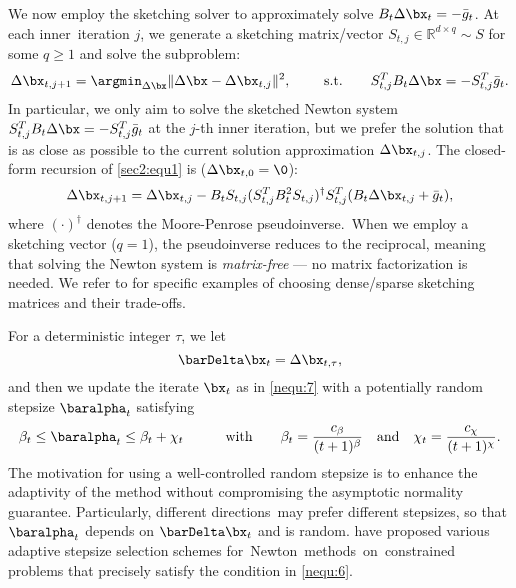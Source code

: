 We now employ the sketching solver to approximately solve $B_t\Delta\bx_t = -\bar{g}_t$. At each inner~iteration $j$, we generate a sketching matrix/vector $S_{t,j}\in\mathbb{R}^{d\times q}\sim S$ for some $q\geq 1$ and solve the subproblem:
\begin{equation}\label{sec2:equ1}
\Delta\bx_{t,j+1} = \argmin_{\Delta\bx}\|\Delta\bx-\Delta\bx_{t,j}\|^2,\quad\quad\text{ s.t. }\quad \;\; S_{t,j}^TB_t\Delta\bx = -S_{t,j}^T\bar{g}_t.
\end{equation}
In particular, we only aim to solve the sketched Newton system $S_{t,j}^TB_t\Delta\bx = -S_{t,j}^T\bar{g}_t$ at the $j$-th inner iteration, but we prefer the solution that is as close as possible to the current solution approximation $\Delta\bx_{t,j}$. The closed-form recursion of \eqref{sec2:equ1} is  ($\Delta\bx_{t,0}=\0$):
\begin{equation}\label{sec2:equ2}
\Delta\bx_{t,j+1} = \Delta\bx_{t,j} - B_tS_{t,j}(S_{t,j}^TB_t^2S_{t,j})^{\dagger}S_{t,j}^T(B_t\Delta\bx_{t,j}+\bar{g}_t),
\end{equation}
where $(\cdot)^{\dagger}$ denotes the Moore-Penrose pseudoinverse.~When we employ a sketching vector ($q=1$), the pseudoinverse reduces to the reciprocal, meaning that solving the Newton system is \textit{matrix-free} --- no matrix factorization is needed. We refer to \cite{Strohmer2008Randomized, Gower2015Randomized} for specific examples of choosing dense/sparse sketching matrices and their trade-offs.


For a deterministic integer $\tau$, we let
\begin{equation}\label{nequ:8}
\barDelta\bx_t = \Delta\bx_{t, \tau},
\end{equation}
and then we update the iterate $\bx_t$ as in \eqref{nequ:7} with a potentially random stepsize $\baralpha_t$ satisfying
\begin{equation}\label{nequ:6}
\beta_{t}\leq \baralpha_t\leq \beta_{t}+\chi_t \quad\quad\quad \text{with}\quad\quad \beta_t=\frac{c_{\beta}}{(t+1)^{\beta}} \quad\text{and}\quad \chi_t=\frac{c_{\chi}}{(t+1)^{\chi}}.
\end{equation}
The motivation for using a well-controlled random stepsize is to enhance the adaptivity of the method without compromising the asymptotic normality guarantee. Particularly, different directions~may prefer different stepsizes, so that $\baralpha_t$ depends on $\barDelta\bx_t$ and is random.
\cite{Berahas2021Sequential, Berahas2023Stochastic, Curtis2024Stochastic} have proposed various adaptive stepsize selection schemes for~\mbox{Newton}~\mbox{methods}~on~constrained problems that precisely satisfy the condition in \eqref{nequ:6}.

